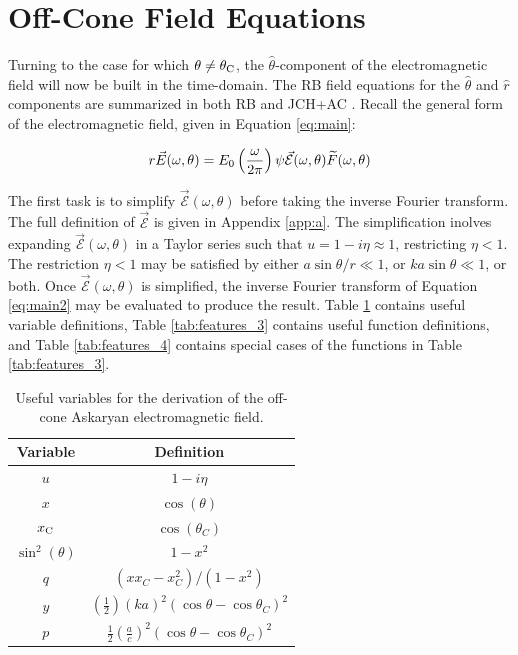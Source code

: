 \documentclass[amsmath,amssymb,aps,prd,10pt,twocolumn]{revtex4}
\begin{document}
\section{Off-Cone Field Equations}
\label{sec:ofc}

Turning to the case for which $\theta \neq \theta_{\rm C}$, the $\hat{\theta}$-component of the electromagnetic field  will now be built in the time-domain.  The RB field equations for the $\hat{\theta}$ and $\hat{r}$ components are summarized in both RB and JCH+AC \cite{10.1103/physrevd.65.016003,10.1016/j.astropartphys.2017.03.008}.  Recall the general form of the electromagnetic field, given in Equation \ref{eq:main}:

\begin{equation}
r\vec{E}(\omega,\theta) = E_{\rm 0} \left( \frac{\omega}{2\pi} \right) \psi \vec{\mathcal{E}}(\omega,\theta) \widetilde{F}(\omega,\theta) \label{eq:main2}
\end{equation}

The first task is to simplify $\vec{\mathcal{E}}(\omega,\theta)$ before taking the inverse Fourier transform.  The full definition of $\vec{\mathcal{E}}$ is given in Appendix \ref{app:a}. The simplification inolves expanding $\vec{\mathcal{E}}(\omega,\theta)$ in a Taylor series such that $u = 1-i\eta \approx 1$, restricting $\eta < 1$.  The restriction $\eta < 1$ may be satisfied by either $a\sin\theta/r \ll 1$, or $k a \sin\theta \ll 1$, or both. Once $\vec{\mathcal{E}}(\omega,\theta)$ is simplified, the inverse Fourier transform of Equation \ref{eq:main2} may be evaluated to produce the result.  Table \ref{tab:features_2} contains useful variable definitions, Table \ref{tab:features_3} contains useful function definitions, and Table \ref{tab:features_4} contains special cases of the functions in Table \ref{tab:features_3}.

\begin{table}
\renewcommand{\arraystretch}{1.5}
\begin{tabular}{| c | c |} \hline
Variable & Definition \\ \hline
$u$ & $1-i\eta$ \\
$x$ & $\cos(\theta)$ \\
$x_{\rm C}$ & $\cos(\theta_C)$ \\
$\sin^2(\theta)$ & $1 - x^2$ \\
$q$ & $(x x_C - x^2_C)/(1-x^2)$ \\
$y$ & $\left( \frac{1}{2} \right) (ka)^2 (\cos\theta - \cos\theta_C)^2$ \\
$p$ & $\frac{1}{2}\left(\frac{a}{c}\right)^2 \left(\cos\theta - \cos\theta_C\right)^2$ \\ \hline
\end{tabular}
\caption{\label{tab:features_2} Useful variables for the derivation of the off-cone Askaryan electromagnetic field.}
\end{table}
\end{document}
